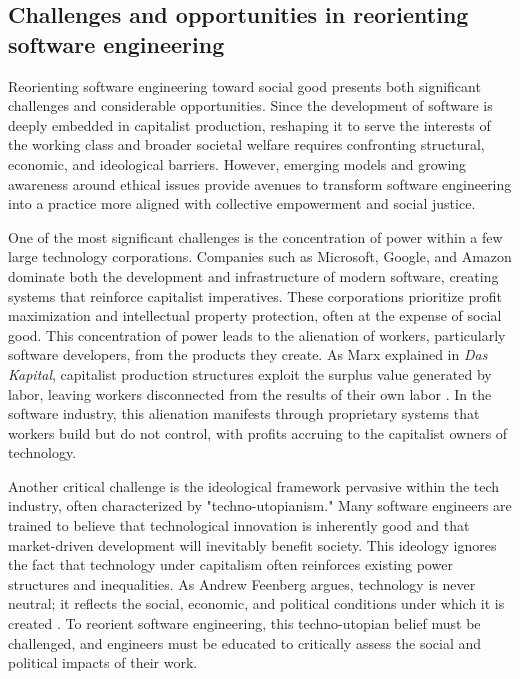 \begin{refsection}
\subsection{Challenges and opportunities in reorienting software engineering}

Reorienting software engineering toward social good presents both significant challenges and considerable opportunities. Since the development of software is deeply embedded in capitalist production, reshaping it to serve the interests of the working class and broader societal welfare requires confronting structural, economic, and ideological barriers. However, emerging models and growing awareness around ethical issues provide avenues to transform software engineering into a practice more aligned with collective empowerment and social justice.

One of the most significant challenges is the concentration of power within a few large technology corporations. Companies such as Microsoft, Google, and Amazon dominate both the development and infrastructure of modern software, creating systems that reinforce capitalist imperatives. These corporations prioritize profit maximization and intellectual property protection, often at the expense of social good. This concentration of power leads to the alienation of workers, particularly software developers, from the products they create. As Marx explained in \textit{Das Kapital}, capitalist production structures exploit the surplus value generated by labor, leaving workers disconnected from the results of their own labor \cite[pp.~350-352]{marx2018}. In the software industry, this alienation manifests through proprietary systems that workers build but do not control, with profits accruing to the capitalist owners of technology.

Another critical challenge is the ideological framework pervasive within the tech industry, often characterized by "techno-utopianism." Many software engineers are trained to believe that technological innovation is inherently good and that market-driven development will inevitably benefit society. This ideology ignores the fact that technology under capitalism often reinforces existing power structures and inequalities. As Andrew Feenberg argues, technology is never neutral; it reflects the social, economic, and political conditions under which it is created \cite[pp.~76-78]{feenberg2010}. To reorient software engineering, this techno-utopian belief must be challenged, and engineers must be educated to critically assess the social and political impacts of their work.


\end{refsection}
